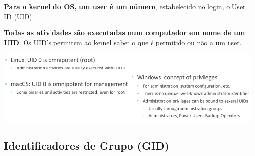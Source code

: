 \documentclass{article}
\begin{document}
\begin{flushleft}
  \textbf{Para o kernel do OS, um user é um número}, estabelecido no login, o User ID (UID).

  \vspace{2mm}

  \textbf{Todas as atividades são executadas num computador em nome de um UID}. Os UID's
  permitem ao kernel saber o que é permitido ou não a um user.
\end{flushleft}

\begin{center}
  \includegraphics[scale=0.4]{29}
\end{center}

\subsection{Identificadores de Grupo (GID)}
\end{document}
